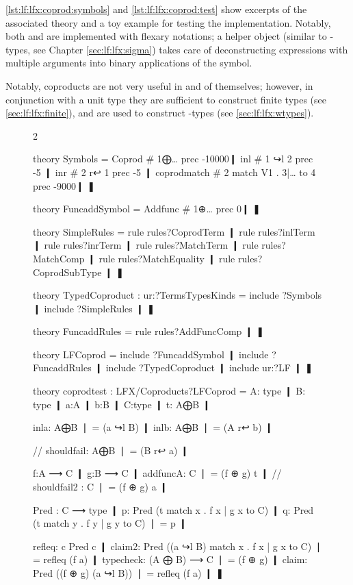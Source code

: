 \autoref{lst:lf:lfx:coprod:symbols} and \autoref{lst:lf:lfx:coprod:test} show excerpts of the associated \mmt theory and a toy example for testing the implementation. Notably, both \coprodsym and \cmatchsym are implemented with flexary notations; a helper object (similar to \sigmasym-types, see Chapter \autoref{sec:lf:lfx:sigma}) takes care of deconstructing expressions with multiple arguments into binary applications of the symbol.

Notably, coproducts are not very useful in and of themselves; however, in conjunction with a unit type they are sufficient to construct finite types (see \autoref{sec:lf:lfx:finite}), and are used to construct \wtypesym-types (see \autoref{sec:lf:lfx:wtypes}).

\begin{figure}
\begin{multicols}{2}
\begin{mmtcode}[caption={Symbols and Rules (\cn{Coproducts.mmt})},label=lst:lf:lfx:coprod:symbols]
theory Symbols =
  Coprod # 1⨁…  prec -10000❙
  inl # 1 ↪l 2 prec -5 ❙
  inr # 2 r↩ 1 prec -5 ❙
  coprodmatch 
    # 2 match V1 . 3|… to 4 
      prec -9000❙
❚
	
theory FuncaddSymbol =
  Addfunc # 1⊕… prec 0❙
❚
	
theory SimpleRules =
   rule rules?CoprodTerm ❙
   rule rules?inlTerm ❙
   rule rules?inrTerm ❙
   rule rules?MatchTerm ❙
   rule rules?MatchComp ❙
   rule rules?MatchEquality ❙
   rule rules?CoprodSubType ❙
❚

theory TypedCoproduct 
    : ur:?TermsTypesKinds =
  include ?Symbols ❙
  include ?SimpleRules ❙
❚


theory FuncaddRules =
  rule rules?AddFuncComp ❙
❚

theory LFCoprod =
  include ?FuncaddSymbol ❙
  include ?FuncaddRules ❙
  include ?TypedCoproduct ❙
  include ur:?LF ❙
❚
\end{mmtcode}
\columnbreak
\begin{mmtcode}[caption={Example Theory Testing Coproducts (\cn{Test.mmt})},label=lst:lf:lfx:coprod:test]
theory coprodtest 
    : LFX/Coproducts?LFCoprod =
  A: type ❙
  B: type ❙
  a:A ❙
  b:B ❙
  C:type ❙
  t: A⨁B ❙
	
  inla: A⨁B ❘ = (a ↪l B) ❙
  inlb: A⨁B ❘ = (A r↩ b) ❙
	
  // shouldfail: A⨁B ❘ = (B r↩ a) ❙
	
  f:A ⟶ C ❙
  g:B ⟶ C ❙
  addfuncA: C ❘ = (f ⊕ g) t ❙
  // shouldfail2 : C ❘ = (f ⊕ g) a ❙
	
  Pred : C ⟶ type ❙
  p: Pred (t match x . 
    f x | g x to C) ❙
  q: Pred (t match y . 
    f y | g y to C) ❘ 
    = p ❙
	
  refleq: {c} Pred c ❙
  claim2: Pred ((a ↪l B) match x . 
    f x | g x to C) ❘ 
    = refleq (f a) ❙
  typecheck: (A ⨁ B) ⟶ C ❘ 
    = (f ⊕ g) ❙
  claim: Pred ((f ⊕ g) (a ↪l B)) ❘ 
    = refleq (f a) ❙
❚
\end{mmtcode}
\end{multicols}
\end{figure}

